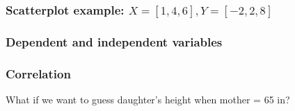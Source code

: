 \documentclass[handout]{beamer}
\begin{document}
   \begin{frame}
   \frametitle{Scatterplot example: $X=[1,4,6], Y=[-2,2,8]$}
   \begin{center}
   \end{center}

   \end{frame}



   \begin{frame}
   \frametitle{Dependent and independent variables}
   \begin{center}
   \end{center}

   \end{frame}



   \begin{frame}
   \frametitle{Correlation}
   \begin{center}
   \end{center}
   What if we want to guess daughter's height when mother = 65 in?
   \end{frame}
\end{document}
